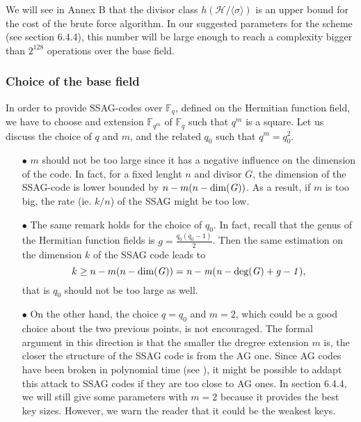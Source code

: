 \documentclass[10pt]{article}
\newcommand{\s}{\vspace{0.3cm}}
\newcommand{\calH}{\mathcal{H}}
\newcommand{\fqm}{\mathbb{F}_{q^m}}
\newcommand{\fq}{\mathbb{F}_q}
\begin{document}
\s 

We will see in Annex B that the divisor class $h(\calH/\langle \sigma \rangle)$
is an upper bound for the cost of the brute force algorithm. In our suggested parameters for the scheme (see section 6.4.4), this number will be large enough to reach a complexity bigger than $2^{128}$ operations over the base field.

\s

\subsubsection{Choice of the base field}

\s

In order to provide SSAG-codes over $\fq$, defined on the Hermitian function field, we have to choose and extension $\fqm$ of $\fq$ such that $q^m$ is a square. Let us discuss the choice of $q$ and $m$, and the related $q_0$ such that $q^m=q_0^2$.

\begin{enumerate}
\item[$\bullet$] $m$ should not be too large since it has a negative influence on the dimension of the code. In fact, for a fixed lenght $n$ and divisor $G$, the dimension of the SSAG-code is lower bounded by $n-m(n-\rm dim \it (G))$. As a result, if $m$ is too big, the rate (ie. $k/n$) of the SSAG might be too low.
\item[$\bullet$] The same remark holds for the choice of $q_0$. In fact, recall that the genus of the Hermitian function fields is $g=\frac{q_0(q_0-1)}{2}$. Then the same estimation on the dimension $k$ of the SSAG code leads to 
\[k \geq n-m(n-\rm dim \it (G)) = n-m(n-\rm deg \it (G) +g-1),\]
that is $q_0$ should not be too large as well.
\item[$\bullet$] On the other hand, the choice $q=q_0$ and $m=2$, which could be a good choice about the two previous points, is not encouraged. The formal argument in this direction is that the smaller the dregree extension $m$ is, the closer the structure of the SSAG code is from the AG one. Since AG codes have been broken in polynomial time (see \cite{Cou}), it might be possible to addapt this attack to SSAG codes if they are too close to AG ones. In section 6.4.4, we will still give some parameters with $m=2$ because it provides the best key sizes. However, we warn the reader that it could be the weakest keys. 
\end{enumerate}

\s 
\end{document}
